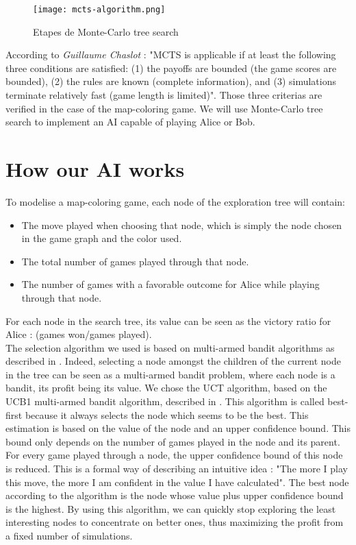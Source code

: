 \begin{figure}
\centering
\texttt{[image: mcts-algorithm.png]}
\caption{Etapes de Monte-Carlo tree search}
\label{treesearch}
\end{figure}

According to \emph{Guillaume Chaslot} \cite{ChaPHD} : "MCTS is
applicable if at least the following three conditions are satisfied: (1) the payoffs are bounded
(the game scores are bounded), (2) the rules are known (complete information), and (3) simulations terminate relatively fast (game length is limited)". Those three criterias are verified in the case of the map-coloring game. We will use Monte-Carlo tree search to implement an AI capable of playing Alice or Bob.\\

\section{How our AI works}

To modelise a map-coloring game, each node of the exploration tree will contain:
\begin{itemize}
\item The move played when choosing that node, which is simply the node chosen in the game graph and the color used.
\item The total number of games played through that node.
\item The number of games with a favorable outcome for Alice while playing through that node.
\end{itemize}
For each node in the search tree, its value can be seen as the victory ratio for Alice : (games won/games played).\\

The selection algorithm we used is based on multi-armed bandit algorithms as described in \cite{MAB}. Indeed, selecting a node amongst the children of the current node in the tree can be seen as a multi-armed bandit problem, where each node is a bandit, its profit being its value. We chose the UCT algorithm, based on the UCB1 multi-armed bandit algorithm, described in \cite{ChaPHD}. This algorithm is called best-first because it always selects the node which seems to be the best. This estimation is based on the value of the node and an upper confidence bound. This bound only depends on the number of games played in the node and its parent. For every game played through a node, the upper confidence bound of this node is reduced. This is a formal way of describing an intuitive idea : "The more I play this move, the more I am confident in the value I have calculated". The best node according to the algorithm is the node whose value plus upper confidence bound is the highest. By using this algorithm, we can quickly stop exploring the least interesting nodes to concentrate on better ones, thus maximizing the profit from a fixed number of simulations.\\

